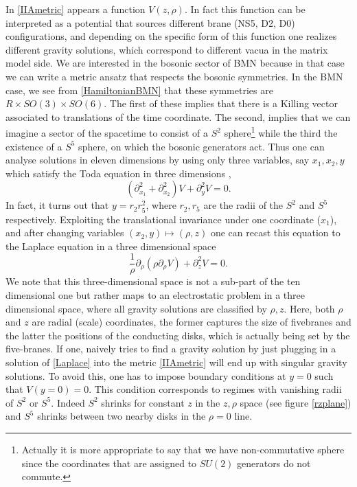 \documentclass[11pt,english]{article}
\newcommand{\be}{\begin{equation}}
\newcommand{\ee}{\end{equation}}
\newcommand{\p}{\partial}
\numberwithin{equation}{section}
\begin{document}
In \eqref{IIAmetric} appears a function $V(z,\rho)$. In fact this function can be interpreted as a potential that sources different brane (NS5, D2, D0) configurations, and depending on the specific form of this function one realizes different gravity solutions, which correspond to different vacua in the matrix model side.  We are interested in the bosonic sector of BMN because in that case we can write a metric ansatz that respects the bosonic symmetries. In the BMN case, we see from \eqref{HamiltonianBMN} that these symmetries are $R\times SO(3)\times SO(6)$. The first of these implies that there is a Killing vector associated to translations of the time coordinate. The second, implies that we can imagine a sector of the spacetime to consist of a $S^2$ sphere\footnote{Actually it is more appropriate to say that we have non-commutative sphere since the coordinates that are assigned to $SU(2)$ generators do not commute. } while the third the existence of a $S^5$ sphere, on which the bosonic generators act. Thus one can analyse solutions in eleven dimensions by using only three variables, say $x_1,x_2,y$ which satisfy the Toda equation in three dimensions \cite{Lin2004},\cite{Lin2006}
\be \label{toda}
\left(\p_{x_1}^2+\p_{x_2}^2\right)V+\p_y^2V=0.
\ee
In fact, it turns out that $y=r_2r_5^2$, where $r_2,r_5$ are the radii of the $S^2$ and $S^5$ respectively. Exploiting the translational invariance under one coordinate ($x_1$), and after changing variables $(x_2,y)\mapsto(\rho,z)$ one can recast this equation to the Laplace equation in a three dimensional space \cite{Lin2004}
\be \label{Laplace}
\frac{1}{\rho}\p_\rho\left(\rho\p_\rho V\right)+\p_z^2V=0.
\ee
We note that this three-dimensional space is not a sub-part of the ten dimensional one but rather maps to an electrostatic problem in a three dimensional space, where all gravity solutions are classified by $\rho,z$. Here, both $\rho$ and $z$ are radial (scale) coordinates, the former captures  the size of fivebranes and the latter the positions of the conducting disks, which is actually being set by the five-branes.  
If one, naively tries to find a gravity solution by just plugging in a solution of  \eqref{Laplace} into the metric \eqref{IIAmetric} will end up with singular gravity solutions. To avoid this, one has to impose boundary conditions at $y=0$ such that $V(y=0)=0$. This condition corresponds to regimes with vanishing radii of $S^2$ or $S^5$. Indeed $S^2$ shrinks for constant $z$ in the $z,\rho$ space (see figure \ref{rzplane}) and $S^5$ shrinks between two nearby disks in the $\rho=0$ line. 
\end{document}
